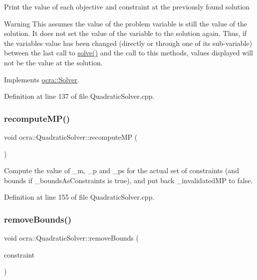 Print the value of each objective and constraint at the previously found solution

\begin{DoxyWarning}{Warning}
This assumes the value of the problem variable is still the value of the solution. It does not set the value of the variable to the solution again. Thus, if the variable\textquotesingle{}s value has been changed (directly or through one of its sub-\/variable) between the last call to \hyperlink{classocra_1_1Solver_a86151fea09399da16d6ce47abb1ba904}{solve()} and the call to this methods, values displayed will not be the value at the solution. 
\end{DoxyWarning}


Implements \hyperlink{classocra_1_1Solver_ab1903098e25c16a9f92c36d37967e8fa}{ocra\+::\+Solver}.



Definition at line 137 of file Quadratic\+Solver.\+cpp.

\hypertarget{classocra_1_1QuadraticSolver_a8494b09625e461a6fa73e2cca762abae}{}\label{classocra_1_1QuadraticSolver_a8494b09625e461a6fa73e2cca762abae} 
\subsubsection{\texorpdfstring{recompute\+M\+P()}{recomputeMP()}}
{\footnotesize\ttfamily void ocra\+::\+Quadratic\+Solver\+::recompute\+MP (\begin{DoxyParamCaption}{ }\end{DoxyParamCaption})\hspace{0.3cm}{\ttfamily [protected]}}

Compute the value of \+\_\+m, \+\_\+p and \+\_\+ps for the actual set of constraints (and bounds if \+\_\+bounds\+As\+Constraints is true), and put back \+\_\+invalidated\+MP to false. 

Definition at line 155 of file Quadratic\+Solver.\+cpp.

\hypertarget{classocra_1_1QuadraticSolver_aaa23af59a18bd6b2883199fd45a750c0}{}\label{classocra_1_1QuadraticSolver_aaa23af59a18bd6b2883199fd45a750c0} 
\subsubsection{\texorpdfstring{remove\+Bounds()}{removeBounds()}\hspace{0.1cm}{\footnotesize\ttfamily [1/2]}}
{\footnotesize\ttfamily void ocra\+::\+Quadratic\+Solver\+::remove\+Bounds (\begin{DoxyParamCaption}\item[{\hyperlink{namespaceocra_a6e55fff77635080219964abc301abf18}{Bound\+Constraint} \&}]{constraint }\end{DoxyParamCaption})}



